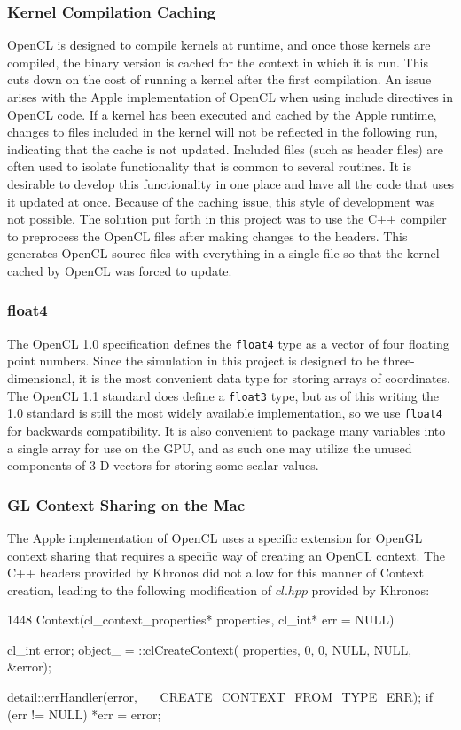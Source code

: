 \subsubsection{Kernel Compilation Caching} 
OpenCL is designed to compile kernels at runtime, and once those kernels are
compiled, the binary version is cached for the context in which it is run. This
cuts down on the cost of running a kernel after the first compilation. An issue
arises with the Apple implementation of OpenCL when using include directives in
OpenCL code. If a kernel has been executed and cached by the Apple runtime,
changes to files included in the kernel will not be reflected in the following
run, indicating that the cache is not updated. Included files (such as header
files) are often used to isolate functionality that is common to several
routines. It is desirable to develop this functionality in one place and have
all the code that uses it updated at once. Because of the caching issue, this
style of development was not possible. The solution put forth in this project
was to use the C++ compiler to preprocess the OpenCL files after making changes
to the headers. This generates OpenCL source files with everything in a single
file so that the kernel cached by OpenCL was forced to update. 


\subsubsection{float4}
The OpenCL 1.0 specification defines the \verb|float4| type as a vector of four
floating point numbers. Since the simulation in this project is designed to be
three-dimensional, it is the most convenient data type for storing arrays of
coordinates. The OpenCL 1.1 standard does define a \verb|float3| type, but as
of this writing the 1.0 standard is still the most widely available
implementation, so we use \verb|float4| for backwards compatibility. It is also
convenient to package many variables into a single array for use on the GPU,
and as such one may utilize the unused components of 3-D vectors for
storing some scalar values.

\subsubsection{GL Context Sharing on the Mac}
The Apple implementation of OpenCL uses a specific extension for OpenGL context
sharing that requires a specific way of creating an OpenCL context. The C++
headers provided by Khronos did not allow for this manner of Context creation,
leading to the following modification of $cl.hpp$ provided by Khronos:
\begin{cppcode}{1448}
Context(cl_context_properties* properties, cl_int* err = NULL)
    {    
        cl_int error;
        object_ = ::clCreateContext(
            properties, 0, 
            0,   
            NULL, NULL, &error);

        detail::errHandler(error, __CREATE_CONTEXT_FROM_TYPE_ERR);
        if (err != NULL) {
            *err = error;
        }    

    }    
\end{cppcode}

